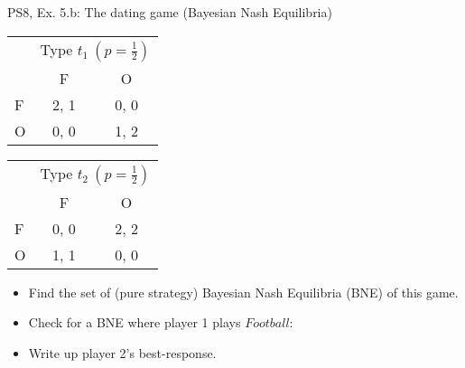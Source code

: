 \begin{frame}{PS8, Ex. 5.b: The dating game (Bayesian Nash Equilibria)}
    \begin{table}
      \begin{tabular}{l|c|c|}
        \multicolumn{1}{c}{} & \multicolumn{2}{c}{Type $t_1\ (p=\frac{1}{2})$} \\
        \multicolumn{1}{c}{} & \multicolumn{1}{c}{F} & \multicolumn{1}{c}{O} \\\cline{2-3}
        F & 2, 1 & 0, 0 \\\cline{2-3}
        O & 0, 0 & 1, 2 \\\cline{2-3}
      \end{tabular}\quad\quad
      \begin{tabular}{l|c|c|}
        \multicolumn{1}{c}{} & \multicolumn{2}{c}{Type $t_2\ (p=\frac{1}{2})$} \\
        \multicolumn{1}{c}{} & \multicolumn{1}{c}{F} & \multicolumn{1}{c}{O} \\\cline{2-3}
        F & 0, 0 & 2, 2 \\\cline{2-3}
        O & 1, 1 & 0, 0 \\\cline{2-3}
      \end{tabular}
    \end{table}
    \begin{itemize}
      \item[(b)] Find the set of (pure strategy) Bayesian Nash Equilibria (BNE) of this game.
    \end{itemize}
    \begin{multicols}{2}
      \begin{itemize}
        \item[Step 1:] Check for a BNE where player 1 plays $Football$:
        \item[1.a:] Write up player 2's best-response.
      \end{itemize}
      \vfill\null\columnbreak
      \vfill\null
    \end{multicols}
\end{frame}
